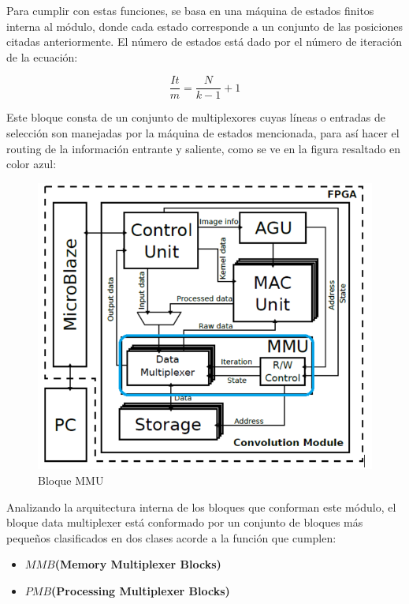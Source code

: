 Para cumplir con estas funciones, se basa en una máquina de estados finitos interna al módulo, donde cada estado corresponde a un conjunto de las posiciones citadas anteriormente.
El número de estados está dado por el número de iteración de la ecuación:

\begin{equation}\label{niter}
  \frac{It}{m} = \frac{N}{k-1} + 1
\end{equation}
\bigskip

Este bloque consta de un conjunto de multiplexores cuyas líneas o entradas de selección son manejadas por la máquina de estados mencionada, para así hacer el routing de la información entrante y saliente, como se ve en la figura resaltado en color azul:
\begin{figure}
\centering
\includegraphics[scale=0.8]{arq_blue.png}
\caption{Bloque MMU}
\label{mmu_location}
\end{figure}

\bigskip
Analizando la arquitectura interna de los bloques que conforman este módulo, el bloque data multiplexer está conformado por un conjunto de bloques más pequeños clasificados en dos clases acorde a la función que cumplen:
\begin{frame}{}
\begin{itemize}

 \item \textbf{$MMB$(Memory Multiplexer Blocks)}
  \item \textbf{$PMB$(Processing Multiplexer Blocks)}

\end{itemize}
\end{frame}


